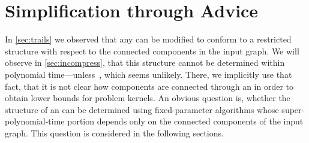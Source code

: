 \section{Simplification through Advice}\label{sec:advice}

In \autoref{sec:trails} we observed that any \EE{} can be modified to conform to a restricted structure with respect to the connected components in the input graph. We will observe in \autoref{sec:incompress}, that this structure cannot be determined within polynomial time---unless~, which seems unlikely. There, we implicitly use that fact, that it is not clear how components are connected through an \EE{} in order to obtain lower bounds for problem kernels. An obvious question is, whether the structure of an \EE{} can be determined using fixed-parameter algorithms whose super-polynomial-time portion depends only on the connected components of the input graph. This question is considered in the following sections.

